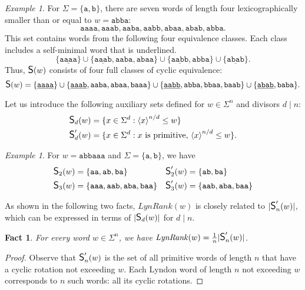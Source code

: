 \documentclass{article}
\newcommand{\mayqed}{}
\newcommand{\CS}{\mbox{\large{\sf{S}}}}
\newcommand{\Lynd}{\mathit{LynRank}}
\newcommand{\minrot}[1]{\left\langle #1 \right\rangle}
\newtheorem{fact}[theorem]{Fact}
\theoremstyle{definition}
\theoremstyle{remark}
\newtheorem{example}[theorem]{Example}
\begin{document}
\begin{example}
  For $\Sigma=\{\mathtt{a},\mathtt{b}\}$,
  there are seven words of length four lexicographically smaller than or equal to $w=\mathtt{abba}$:
  $$\mathtt{aaaa},\mathtt{aaab},\mathtt{aaba},\mathtt{aabb},\mathtt{abaa},\mathtt{abab},\mathtt{abba}.$$
  This set contains words from the following four equivalence classes.
  Each class includes a self-minimal word that is underlined.
    $$\{\mathtt{\underline{aaaa}}\}\cup\{\mathtt{\underline{aaab}},\mathtt{aaba},\mathtt{abaa}\}\cup\{\mathtt{\underline{aabb}},\mathtt{abba}\}\cup\{\mathtt{\underline{abab}}\}.$$
  Thus, $\CS(w)$ consists of four full classes of cyclic equivalence:
  $$\CS(w)=\{\mathtt{\underline{aaaa}}\}\cup
             \{\mathtt{\underline{aaab}},\mathtt{aaba},\mathtt{abaa},\mathtt{baaa}\}\cup
             \{\mathtt{\underline{aabb}},\mathtt{abba},\mathtt{bbaa},\mathtt{baab}\}\cup
             \{\mathtt{\underline{abab}},\mathtt{baba}\}.$$
\end{example}

Let us introduce the following auxiliary sets defined for $w\in \Sigma^n$ and divisors $d \mid n$:
\begin{align*}
  \CS_d(w)  &= \{x \in \Sigma^d : \minrot{x}^{n/d}\le w \}\\
  \CS'_d(w) &= \{x \in \Sigma^d : x\mbox{ is primitive},\,\minrot{x}^{n/d}\le w\}.
\end{align*}

\begin{example}
  For $w=\mathtt{abbaaa}$ and $\Sigma=\{\mathtt{a},\mathtt{b}\}$, we have
  \begin{align*}
  \CS_2(w)&=\{\mathtt{aa,ab,ba}\} & \CS'_2(w)&=\{\mathtt{ab},\mathtt{ba}\}\\
  \CS_3(w)&=\{\mathtt{aaa},\mathtt{aab},\mathtt{aba},\mathtt{baa}\} & \CS'_3(w)&=\{\mathtt{aab},\mathtt{aba},\mathtt{baa}\}
  \end{align*}
\end{example}

As shown in the following two facts, $\Lynd(w)$ is closely related to $|\CS'_n(w)|$,
which can be expressed in terms of $|\CS_d(w)|$ for $d \mid n$.

\begin{fact}\label{fct:lyndtocsprime}
For every word $w\in \Sigma^n$, we have $\Lynd(w) = \frac{1}{n}|\CS'_{n}(w)|$.
 \end{fact}
  \begin{proof}
    Observe that $\CS'_n(w)$ is the set of all primitive words of length $n$ that have a cyclic
    rotation not exceeding $w$. Each Lyndon word of length $n$ not exceeding $w$ 
    corresponds to $n$ such words: all its cyclic rotations.
  \mayqed\end{proof}
\end{document}
